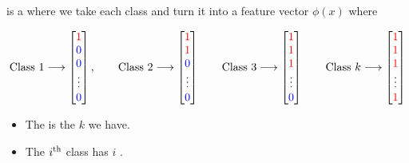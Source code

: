                 \begin{definition}
                     is a  where we take each class and turn it into a feature vector $\phi(x)$ where

                    \begin{equation*}
                        \text{Class 1} \longrightarrow
                        \begin{bmatrix}
                        \textcolor{red}{1} \\ \textcolor{blue}{0} \\ \textcolor{blue}{0} \\ \vdots \\ \textcolor{blue}{0}
                        \end{bmatrix},
                        \qquad
                        \text{Class 2} \longrightarrow
                        \begin{bmatrix}
                        \textcolor{red}{1} \\ \textcolor{red}{1} \\ \textcolor{blue}{0} \\ \vdots \\ \textcolor{blue}{0}
                        \end{bmatrix}
                        \qquad
                        \text{Class 3} \longrightarrow
                        \begin{bmatrix}
                        \textcolor{red}{1} \\ \textcolor{red}{1} \\ \textcolor{red}{1} \\ \vdots \\ \textcolor{blue}{0}
                        \end{bmatrix}
                        \qquad
                        \text{Class } k \longrightarrow
                        \begin{bmatrix}
                        \textcolor{red}{1} \\ \textcolor{red}{1} \\ \textcolor{red}{1} \\ \vdots \\ \textcolor{red}{1}
                        \end{bmatrix}
                    \end{equation*}

                    \begin{itemize}
                        \item The  is the  $k$ we have.
                        \item The $i^{ \text{th} }$ class has $i$ .
                    \end{itemize}


\end{definition}
